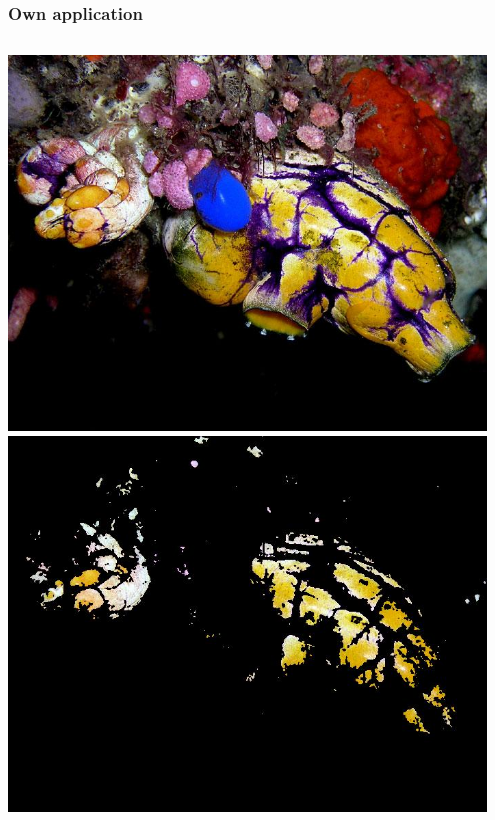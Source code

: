 \documentclass{beamer}
\begin{document}
\begin{frame}
    \frametitle{Own application}
    \begin{columns}
            \centering
            \includegraphics[width=0.95\textwidth]{report-images/Polycarpa_Nick_Hobgood.jpg}
            \centering
            \includegraphics[width=0.95\textwidth]{report-images/thresh_Polycarpa_Nick_Hobgood.jpg}
    \end{columns}
\end{frame}
\end{document}
